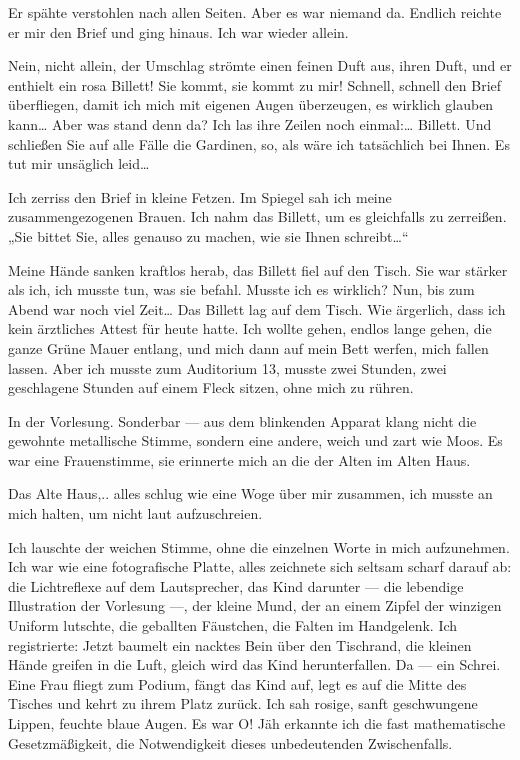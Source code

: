 Er spähte verstohlen nach allen Seiten. Aber es war niemand da.
Endlich reichte er mir den Brief und ging hinaus. Ich war wieder
allein.

Nein, nicht allein, der Umschlag strömte einen feinen Duft aus,
ihren Duft, und er enthielt ein rosa Billett! Sie kommt, sie kommt
zu mir! Schnell, schnell den Brief überfliegen, damit ich mich mit
eigenen Augen überzeugen, es wirklich glauben kann\ldots{} Aber was
stand denn da? Ich las ihre Zeilen noch einmal:\ldots{} Billett. Und
schließen Sie auf alle Fälle die Gardinen, so, als wäre ich
tatsächlich bei Ihnen. Es tut mir unsäglich leid\ldots{}

Ich zerriss den Brief in kleine Fetzen. Im Spiegel sah ich meine
zusammengezogenen Brauen. Ich nahm das Billett, um es gleichfalls
zu zerreißen. „Sie bittet Sie, alles genauso zu machen, wie sie
Ihnen schreibt\ldots{}“

Meine Hände sanken kraftlos herab, das Billett fiel auf den Tisch.
Sie war stärker als ich, ich musste tun, was sie befahl. Musste ich
es wirklich? Nun, bis zum Abend war noch viel Zeit\ldots{} Das Billett
lag auf dem Tisch. Wie ärgerlich, dass ich kein ärztliches Attest
für heute hatte. Ich wollte gehen, endlos lange gehen, die ganze
Grüne Mauer entlang, und mich dann auf mein Bett werfen, mich
fallen lassen. Aber ich musste zum Auditorium 13, musste zwei
Stunden, zwei geschlagene Stunden auf einem Fleck sitzen, ohne mich
zu rühren.

In der Vorlesung. Sonderbar — aus dem blinkenden Apparat klang
nicht die gewohnte metallische Stimme, sondern eine andere, weich
und zart wie Moos. Es war eine Frauenstimme, sie erinnerte mich an
die der Alten im Alten Haus.

Das Alte Haus,.. alles schlug wie eine Woge über mir zusammen, ich
musste an mich halten, um nicht laut aufzuschreien.

Ich lauschte der weichen Stimme, ohne die einzelnen Worte in mich
aufzunehmen. Ich war wie eine fotografische Platte, alles zeichnete
sich seltsam scharf darauf ab: die Lichtreflexe auf dem
Lautsprecher, das Kind darunter — die lebendige Illustration der
Vorlesung —, der kleine Mund, der an einem Zipfel der winzigen
Uniform lutschte, die geballten Fäustchen, die Falten im
Handgelenk. Ich registrierte: Jetzt baumelt ein nacktes Bein über
den Tischrand, die
kleinen Hände greifen in die Luft, gleich wird das Kind
herunterfallen. Da — ein Schrei. Eine Frau fliegt zum Podium, fängt
das Kind auf, legt es auf die Mitte des Tisches und kehrt zu ihrem
Platz zurück. Ich sah rosige, sanft geschwungene Lippen, feuchte
blaue Augen. Es war O! Jäh erkannte ich die fast mathematische
Gesetzmäßigkeit, die Notwendigkeit dieses unbedeutenden
Zwischenfalls.

